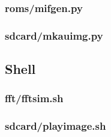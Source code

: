 \documentclass{article}
\begin{document}
	\subsubsection{roms/mifgen.py}
	
	\subsubsection{sdcard/mkauimg.py}
	

\subsection{Shell}
	\subsubsection{fft/fftsim.sh}
	
	\subsubsection{sdcard/playimage.sh}
	
 
\end{document}
